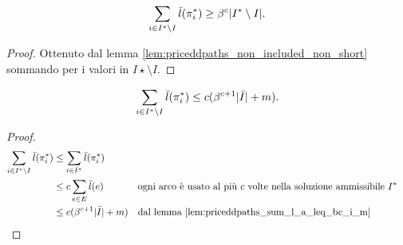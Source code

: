 \begin{corollario}\label{cor:priceddpaths_cor_1}
	\begin{equation*}
		\sum_{i\in I^*\setminus I} \bar l(\pi_i^*) \geq \beta^c | I^*\setminus I | \text.
	\end{equation*}
\end{corollario}
\begin{proof}
	Ottenuto dal lemma \ref{lem:priceddpaths_non_included_non_short} sommando per i valori in $I\star\setminus I$.
\end{proof}

\begin{corollario}\label{cor:priceddpaths_cor_2}
	\begin{equation*}
		\sum_{i\in I^*\setminus I} \bar l(\pi^*_i) \leq c(\beta^{c+1}| \bar I |+m) \text.
	\end{equation*}
\end{corollario}
\begin{proof}
	\begin{align*}
		\sum_{i\in I^*\setminus I} \bar l(\pi^*_i) & \leq \sum_{i\in I^*} \bar l(\pi^*_i)                                                                                     \\
		                                                 & \leq c \sum_{e\in E} \bar l(e)             &  & \text{ogni arco è usato al più $c$ volte nella soluzione ammissibile $I^*$} \\
		                                                 & \leq c (\beta^{c+1}| \bar I |+m)        &  & \text{dal lemma \ref{lem:priceddpaths_sum_l_a_leq_bc_i_m}}
	\end{align*}
\end{proof}

